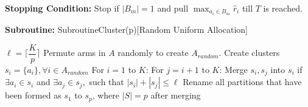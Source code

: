 \begin{algorithm}
\begin{algorithmic}[1]
\State \hspace*{2em} \textbf{Stopping Condition:} 
\newline \hspace*{2em} Stop if $|B_{m}|=1$ and pull $\max_{a_{i}\in B_{m}}\hat{r}_{i}$ till $T$ is reached.
\end{algorithmic}
\textbf{Subroutine:} SubroutineCluster(p)[Random Uniform Allocation]\\[-0.3cm]
\begin{algorithmic}[1]
\State \hspace*{2em} $\ell=\bigg\lceil \dfrac{K}{p} \bigg\rceil$
\State \hspace*{2em} Permute arms in $A$ randomly to create $A_{random}$.
\State \hspace*{2em} Create clusters $s_{i}=\lbrace a_{i}\rbrace, \forall i\in A_{random}$
\State \hspace*{2em} For $i=1$ to $K$:
\State \hspace*{4em} For $j=i+1$ to $K$:
\State \hspace*{6em} Merge $s_{i},s_{j}$ into $s_{i}$ if $\exists a_{i}\in s_{i} $ and $\exists a_{j}\in s_{j},$ such that $|s_{i}|+|s_{j}|\leq \ell$
\State \hspace*{2em} Rename all partitions that have been formed as $s_{1}$ to $s_{p}$, where $|S|=p$ after merging
\end{algorithmic}

\end{algorithm}



